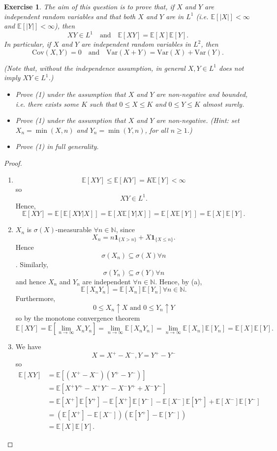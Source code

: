 \documentclass{article}
\newtheorem{exercise}[theorem]{Exercise}
\begin{document}
\begin{exercise}
The aim of this question is to prove that, if \(X\) and \(Y\) are independent random variables and that both \(X\) and \(Y\) are in \(L^1\) (i.e. \(\mathbb{E}[|X|] < \infty\) and \(\mathbb{E}[|Y|] < \infty\)), then
\[
XY \in L^1 \quad \text{and} \quad \mathbb{E}[XY] = \mathbb{E}[X] \mathbb{E}[Y]. \tag{1}
\]
In particular, if \(X\) and \(Y\) are independent random variables in \(L^2\), then
\[
\text{Cov}(X,Y) = 0 \quad \text{and} \quad \text{Var}(X + Y) = \text{Var}(X) + \text{Var}(Y).
\]

(Note that, without the independence assumption, in general \(X, Y \in L^1\) does \emph{not} imply \(XY \in L^1\).)

\begin{itemize}
    \item[(a)] Prove (1) under the assumption that \(X\) and \(Y\) are non-negative and bounded, i.e. there exists some \(K\) such that \(0 \leq X \leq K\) and \(0 \leq Y \leq K\) almost surely.
    \item[(b)] Prove (1) under the assumption that \(X\) and \(Y\) are non-negative. (Hint: set \(X_n = \min(X, n)\) and \(Y_n = \min(Y, n)\), for all \(n \geq 1\).)
    \item[(c)] Prove (1) in full generality.
\end{itemize}
\end{exercise}
\begin{proof}
\begin{enumerate}
    \item[(a)] \[\mathbb{E}[XY]\leq\mathbb{E}[KY]=K\mathbb{E}[Y]<\infty\] so \[XY\in L^1.\]
    Hence,\[\mathbb{E}[XY]=\mathbb{E}[\mathbb{E}[XY|X]]=\mathbb{E}[X\mathbb{E}[Y|X]]=\mathbb{E}[X\mathbb{E}[Y]]=\mathbb{E}[X]\mathbb{E}[Y].\]
    \item[(b)] $X_n$ is $\sigma(X)$-measurable $\forall n\in\mathbb{N}$, since\[X_n=n\mathbf{1}_{\{X>n\}}+X\mathbf{1}_{\{X\leq n\}}.\] Hence \[\sigma(X_n)\subseteq\sigma(X)\forall n\]. Similarly, \[\sigma(Y_n)\subseteq\sigma(Y)\forall n\] and hence $X_n$ and $Y_n$ are independent $\forall n\in\mathbb{N}$. Hence, by (a), \[\mathbb{E}[X_nY_n]=\mathbb{E}[X_n]\mathbb{E}[Y_n]\forall n\in\mathbb{N}.\]
    Furthermore,
    \[0\leq X_n\uparrow X\text{ and }0\leq Y_n\uparrow Y\]so by the monotone convergence theorem
    \[\mathbb{E}[XY]=\mathbb{E}[\lim_{n\to\infty}X_nY_n]=\lim_{n\to\infty}\mathbb{E}[X_nY_n]=\lim_{n\to\infty}\mathbb{E}[X_n]\mathbb{E}[Y_n]=\mathbb{E}[X]\mathbb{E}[Y].\]
    \item[(c)] We have \[X=X^+-X^-,Y=Y^+-Y^-\] so \begin{align*}\mathbb{E}[XY]&=\mathbb{E}[(X^+-X^-)(Y^+-Y^-)]\\&=\mathbb{E}[X^+Y^+-X^+Y^--X^-Y^++X^-Y^-]\\&=\mathbb{E}[X^+]\mathbb{E}[Y^+]-\mathbb{E}[X^+]\mathbb{E}[Y^-]-\mathbb{E}[X^-]\mathbb{E}[Y^+]+\mathbb{E}[X^-]\mathbb{E}[Y^-]\\&=(\mathbb{E}[X^+]-\mathbb{E}[X^-])(\mathbb{E}[Y^+]-\mathbb{E}[Y^-])\\&=\mathbb{E}[X]\mathbb{E}[Y].\end{align*}
\end{enumerate}
\end{proof}
\end{document}
